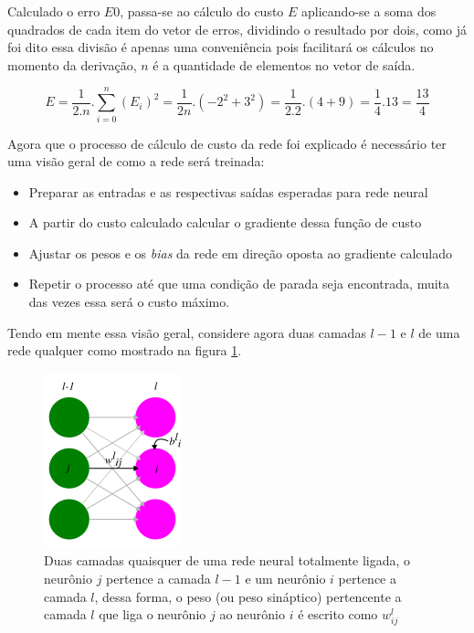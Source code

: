 \begin{apendicesenv}
	\par Calculado o erro $E0$, passa-se ao cálculo do custo $E$ aplicando-se a soma dos quadrados de cada item do vetor de erros, dividindo o resultado por dois, como já foi dito essa divisão é apenas uma conveniência pois facilitará os cálculos no momento da derivação, $n$ é a quantidade de elementos no vetor de saída.
	
	\begin{equation}\label{eq:averageQuadError}
		E = \dfrac{1}{2.n}. \sum_{i=0}^{n}  (E_i)^2 = \dfrac{1}{2n} . (-2^2 + 3^2)  = \dfrac{1}{2.2} . (4 + 9) = \dfrac{1}{4} . 13 = \dfrac{13}{4} 
	\end{equation}


	\par Agora que o processo de cálculo de custo da rede foi explicado é necessário ter uma visão geral de como a rede será treinada:
	
	\begin{itemize}
		\item Preparar as entradas e as respectivas saídas esperadas para rede neural
		\item A partir do custo calculado calcular o gradiente dessa função de custo
		\item Ajustar os pesos e os \textit{bias} da rede em direção oposta ao gradiente calculado
		\item Repetir o processo até que uma condição de parada seja encontrada, muita das vezes essa será o custo máximo.
	\end{itemize}
	
	\par Tendo em mente essa visão geral, considere agora duas camadas $l - 1$ e $l$ de uma rede qualquer como mostrado na figura \ref{fig:layers}.
	
	\begin{figure}[H]
		\centering
		\caption{Duas camadas quaisquer de uma rede neural totalmente ligada, o neurônio $j$ pertence a camada $l -1$ e um neurônio $i$ pertence a camada $l$, dessa forma, o peso (ou peso sináptico) pertencente a camada $l$ que liga o neurônio $j$ ao neurônio $i$ é escrito como $w^l_{ij}$ }
		\label{fig:layers}
		\includegraphics[width=0.5\linewidth]{images/layers}
	\end{figure}


\end{apendicesenv}
